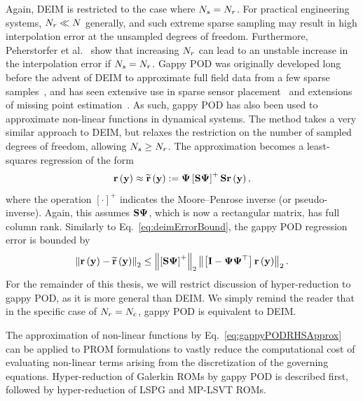 Again, DEIM is restricted to the case where $N_s = N_r$. For practical engineering systems, $N_r \ll N$ generally, and such extreme sparse sampling may result in high interpolation error at the unsampled degrees of freedom. Furthermore, Peherstorfer et al.~\cite{Peherstorfer2020} show that increasing $N_r$ can lead to an unstable increase in the interpolation error if $N_s = N_r$. Gappy POD was originally developed long before the advent of DEIM to approximate full field data from a few sparse samples~\cite{Everson1995}, and has seen extensive use in sparse sensor placement~\cite{willcoxGappyPOD,ManoharSparseSensor} and extensions of missing point estimation~\cite{Zimmermann2016}. As such, gappy POD has also been used to approximate non-linear functions in dynamical systems. The method takes a very similar approach to DEIM, but relaxes the restriction on the number of sampled degrees of freedom, allowing $N_s \ge N_r$. The approximation becomes a least-squares regression of the form
%
\begin{equation}\label{eq:gappyPODRHSApprox}
    \resFunc{\dummyVec} \approx \resApproxFunc{\dummyVec} \defEq \deimBasis \left[ \sampMat \deimBasis \right]^{+} \sampMat \resFunc{\dummyVec},
\end{equation}
%
where the operation $[\cdot]^+$ indicates the Moore--Penrose inverse (or pseudo-inverse). Again, this assumes $\sampMat \deimBasis$, which is now a rectangular matrix, has full column rank. Similarly to Eq.~\ref{eq:deimErrorBound}, the gappy POD regression error is bounded by
%
\begin{equation}\label{eq:gappyPODErrorBound}
    \left\Vert \resFunc{\dummyVec} - \resApproxFunc{\dummyVec} \right\Vert_2 \le \left\Vert \left[ \sampMat \deimBasis \right]^{+} \right\Vert_2 \left\Vert \left[ \identMat - \deimBasis \deimBasis^\top \right] \resFunc{\dummyVec} \right\Vert_2.
\end{equation}
%
For the remainder of this thesis, we will restrict discussion of hyper-reduction to gappy POD, as it is more general than DEIM. We simply remind the reader that in the specific case of $N_r = N_c$, gappy POD is equivalent to DEIM.

The approximation of non-linear functions by Eq.~\ref{eq:gappyPODRHSApprox} can be applied to PROM formulations to vastly reduce the computational cost of evaluating non-linear terms arising from the discretization of the governing equations. Hyper-reduction of Galerkin ROMs by gappy POD is described first, followed by hyper-reduction of LSPG and MP-LSVT ROMs.


